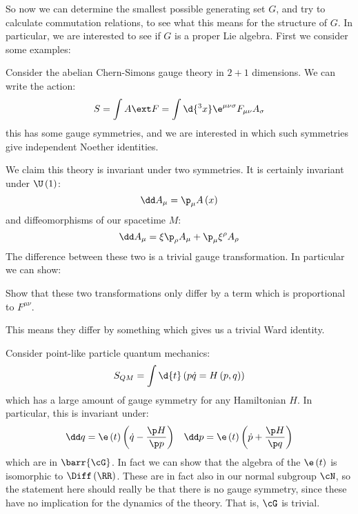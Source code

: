 \documentclass{booc}
\begin{document}
So now we can determine the smallest possible generating set $G$,
and try to calculate commutation relations, to see what this means for the structure of $G$.
In particular, we are interested to see if $G$ is a proper Lie algebra.
First we consider some examples:

\begin{exm}
Consider the abelian Chern-Simons gauge theory in $2+1$ dimensions. 
We can write the action:
\begin{equation}
S = \int A\ext F = 
\int \d{^3 x} \e^{\mu \nu \sigma}F_{\mu\nu} A_\sigma
\end{equation}
this has some gauge symmetries, and we are interested in which 
such symmetries give independent Noether identities.

We claim this theory is invariant under two symmetries. 
It is certainly invariant under $\U\left( 1 \right)$:
\begin{equation}
\dd A_\mu = \p_\mu A\left( x \right)
\end{equation}
and diffeomorphisms of our spacetime $M$:
\begin{equation}
\dd A_\mu = \xi \p_\rho A_\mu + \p_\mu \xi^\rho A_\rho
\end{equation}
The difference between these two is a trivial gauge transformation. In particular we can show:
\begin{exr}
Show that these two transformations only differ by a term which is proportional to
$F^{\mu\nu}$.
\end{exr}
This means they differ by something which gives us a trivial Ward identity. 
\end{exm}

\begin{exm}
Consider point-like particle quantum mechanics:
\begin{equation}
S_{QM} = \int \d{t} \left( p \dot q = H\left( p,q \right) \right)
\end{equation}
which has a large amount of gauge symmetry for any Hamiltonian $H$.
In particular, this is invariant under:
\begin{align}
\dd q = \e\left( t \right) \left( \dot q - \frac{\p H}{\p p} \right)
&&
\dd p= \e\left( t \right) \left( \dot p + \frac{\p H}{\p q} \right)
\end{align}
which are in $\barr{\cG}$.
In fact we can show that the algebra of the 
$\e\left( t \right)$ is isomorphic to $\Diff\left( \RR \right)$.
These are in fact also in our normal subgroup $\cN$, 
so the statement here should really be that there is no gauge symmetry, 
since these have no implication for the dynamics of the theory. 
That is, $\cG$ is trivial.
\end{exm}
\end{document}
